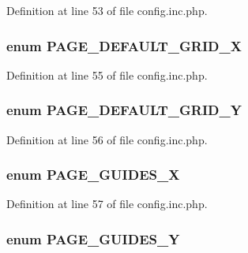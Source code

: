 Definition at line 53 of file config.inc.php.

\hypertarget{config_8inc_8php_abc1c54acdbce897c718854b663517cf9}{
\subsubsection[{PAGE\_\-DEFAULT\_\-GRID\_\-X}]{\setlength{\rightskip}{0pt plus 5cm}enum {\bf PAGE\_\-DEFAULT\_\-GRID\_\-X}}}
\label{config_8inc_8php_abc1c54acdbce897c718854b663517cf9}


Definition at line 55 of file config.inc.php.

\hypertarget{config_8inc_8php_ab93c5dcea5ef58747b80594c3d9304d7}{
\subsubsection[{PAGE\_\-DEFAULT\_\-GRID\_\-Y}]{\setlength{\rightskip}{0pt plus 5cm}enum {\bf PAGE\_\-DEFAULT\_\-GRID\_\-Y}}}
\label{config_8inc_8php_ab93c5dcea5ef58747b80594c3d9304d7}


Definition at line 56 of file config.inc.php.

\hypertarget{config_8inc_8php_a81167deb206874270a59273141919fe5}{
\subsubsection[{PAGE\_\-GUIDES\_\-X}]{\setlength{\rightskip}{0pt plus 5cm}enum {\bf PAGE\_\-GUIDES\_\-X}}}
\label{config_8inc_8php_a81167deb206874270a59273141919fe5}


Definition at line 57 of file config.inc.php.

\hypertarget{config_8inc_8php_a3f78eb981e05f649bfff403c0e595d0b}{
\subsubsection[{PAGE\_\-GUIDES\_\-Y}]{\setlength{\rightskip}{0pt plus 5cm}enum {\bf PAGE\_\-GUIDES\_\-Y}}}
\label{config_8inc_8php_a3f78eb981e05f649bfff403c0e595d0b}



